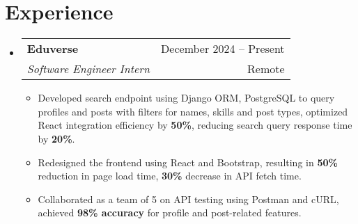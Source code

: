 \documentclass[letterpaper,11pt]{article}
\makeatletter
\newcommand{\resumeItem}[1]{
  \item\small{
    {#1 \vspace{-3pt}}
  }
}
\newcommand{\resumeSubheading}[4]{
    \item
    \begin{tabular*}{0.97\textwidth}[t]{l@{\extracolsep{\fill}}r@{\hspace{-0.1in}}}
        \small{\textbf{#1}} & \small{#2} \\
        \textit{\small#3} & \small #4 \\
    \end{tabular*}\vspace{-5pt}
}
\newcommand{\resumeSubHeadingListStart}{\begin{itemize}[leftmargin=0.00in, rightmargin=-0.2in, label={}]}
\newcommand{\resumeSubHeadingListEnd}{\end{itemize}\vspace{-9pt}}
\newcommand{\resumeItemListStart}{\begin{itemize}[leftmargin=0.15in, rightmargin=0.15in]}
\newcommand{\resumeItemListEnd}{\end{itemize}\vspace{-9pt}}
\makeatother
\begin{document}



\section{Experience}

\resumeSubHeadingListStart
\resumeSubheading
{Eduverse} {December 2024 -- Present}
{Software Engineer Intern} {Remote}
\resumeItemListStart
\resumeItem{Developed search endpoint using Django ORM, PostgreSQL to query profiles and posts with filters for names, skills and post types, optimized React integration efficiency by \textbf{50\%}, reducing search query response time by \textbf{20\%}.}
\resumeItem{Redesigned the frontend using React and Bootstrap, resulting in \textbf{50\%} reduction in page load time, \textbf{30\%} decrease in API fetch time.}
\resumeItem{Collaborated as a team of 5 on API testing using Postman and cURL, achieved \textbf{98\% accuracy} for profile and post-related features.}
\resumeItemListEnd
\resumeSubHeadingListEnd
\end{document}
